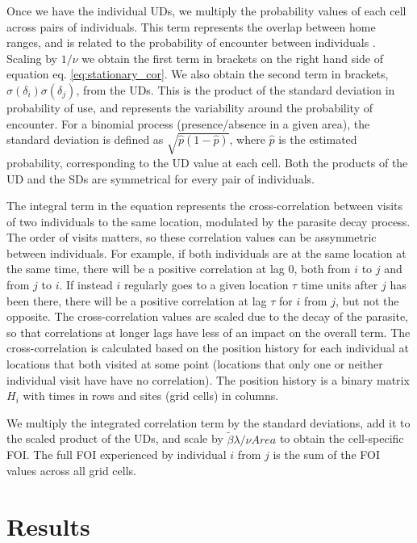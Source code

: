 \documentclass[letterpaper]{article}
\begin{document}
Once we have the individual UDs, we multiply the probability values of each cell across pairs of individuals. This term represents the overlap between home ranges, and is related to the probability of encounter between individuals \citep{Noonan2021}. Scaling by $1/\nu$ we obtain the first term in brackets on the right hand side of equation eq. \ref{eq:stationary_cor}. %
We also obtain the second term in brackets, $\sigma(\delta_i)\sigma(\delta_j)$, from the UDs. This is the product of the standard deviation in probability of use, and represents the variability around the probability of encounter. For a binomial process (presence/absence in a given area), the standard deviation is defined as $\sqrt{\hat p(1-\hat p)}$, where $\hat p$ is the estimated probability, corresponding to the UD value at each cell. Both the products of the UD and the SDs are symmetrical for every pair of individuals. 

The integral term in the equation represents the cross-correlation between visits of two individuals to the same location, modulated by the parasite decay process. The order of visits matters, so these correlation values can be assymmetric between individuals. For example, if both individuals are at the same location at the same time, there will be a positive correlation at lag 0, both from $i$ to $j$ and from $j$ to $i$. If instead $i$ regularly goes to a given location $\tau$ time units after $j$ has been there, there will be a positive correlation at lag $\tau$ for $i$ from $j$, but not the opposite. The cross-correlation values are scaled due to the decay of the parasite, so that correlations at longer lags have less of an impact on the overall term. 
The cross-correlation is calculated based on the position history for each individual at locations that both visited at some point (locations that only one or neither individual visit have have no correlation). The position history is a binary matrix $H_i$ with times in rows and sites (grid cells) in columns. 

We multiply the integrated correlation term by the standard deviations, add it to the scaled product of the UDs, and scale by $\tilde\beta\lambda/\nu Area$ to obtain the cell-specific FOI. The full FOI experienced by individual $i$ from $j$ is the sum of the FOI values across all grid cells. 


\section*{Results}
\end{document}
